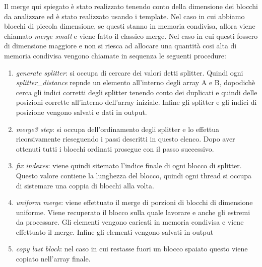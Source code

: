 \documentclass[]{IEEEtran}
\begin{document}
	Il merge qui spiegato è stato realizzato tenendo conto della dimensione dei blocchi da analizzare ed è stato realizzato usando i template. Nel caso in cui abbiamo blocchi di piccola dimensione, se questi stanno in memoria condivisa, allora viene chiamato \textit{merge small} e viene fatto il classico merge. Nel caso in cui questi fossero di dimensione maggiore e non si riesca ad allocare una quantità cosi alta di memoria condivisa vengono chiamate in sequenza le seguenti procedure:
	\begin{enumerate}
		\item \textit{generate splitter}: si occupa di cercare dei valori detti splitter. Quindi ogni \textit{splitter\_distance} repnde un elemento all'interno degli array A e B, dopodichè cerca gli indici corretti degli splitter tenendo conto dei duplicati e quindi delle posizioni corrette all'interno dell'array iniziale. Infine gli splitter e gli indici di posizione vengono salvati e dati in output.
		\item \textit{merge3 step}: si occupa dell'ordinamento degli splitter e lo effettua ricorsivamente rieseguendo i passi descritti in questo elenco. Dopo aver ottenuti tutti i blocchi ordinati prosegue con il passo successivo.
		\item \textit{fix indexes}: viene quindi sitemato l'indice finale di ogni blocco di splitter. Questo valore contiene la lunghezza del blocco, quindi ogni thread si occupa di sistemare una coppia di blocchi alla volta.
		\item \textit{uniform merge}: viene effettuato il merge di porzioni di blocchi di dimensione uniforme. Viene recuperato il blocco sulla quale lavorare e anche gli estremi da processare. Gli elementi vengono caricati in memoria condivisa e viene effettuato il merge. Infine gli elementi vengono salvati in output
		\item \textit{copy last block}: nel caso in cui restasse fuori un blocco spaiato questo viene copiato nell'array finale.
	\end{enumerate} 

	
\end{document}
